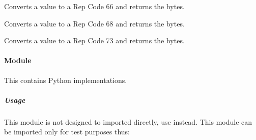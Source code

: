 \documentclass[letterpaper,10pt,english]{sphinxmanual}
\begin{document}

\begin{fulllineitems}
\label{\detokenize{ref/LIS/core/RepCode:TotalDepth.LIS.core.RepCode.writeBytes66}}
Converts a value to a Rep Code 66 and returns the bytes.

\end{fulllineitems}


\begin{fulllineitems}
\label{\detokenize{ref/LIS/core/RepCode:TotalDepth.LIS.core.RepCode.writeBytes68}}
Converts a value to a Rep Code 68 and returns the bytes.

\end{fulllineitems}


\begin{fulllineitems}
\label{\detokenize{ref/LIS/core/RepCode:TotalDepth.LIS.core.RepCode.writeBytes73}}
Converts a value to a Rep Code 73 and returns the bytes.

\end{fulllineitems}



\paragraph{ Module}
\label{\detokenize{ref/LIS/core/RepCode:prepcode-module}}
This contains Python implementations.


\subparagraph{Usage}
\label{\detokenize{ref/LIS/core/RepCode:id1}}
This module is not designed to imported directly, use  instead. This module can be imported only for test purposes thus:

\begin{sphinxVerbatim}[commandchars=\\\{\}]
   
\end{sphinxVerbatim}
\end{document}
